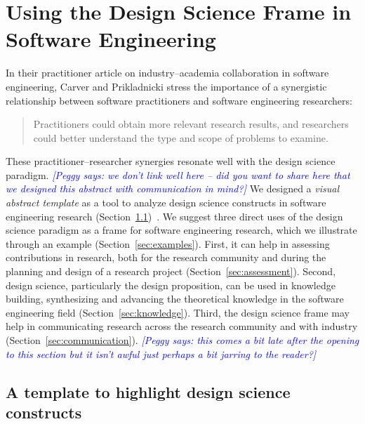 \documentclass[graybox]{svmult}
\newcommand{\peggy}[1]{\textcolor{blue}{{\it [Peggy says: #1]}}}
\newcommand{\peggy}[1]{}
\begin{document}
\section{Using the Design Science Frame in Software Engineering}
\label{sec:UsingDSinSE}

In their practitioner article on industry--academia collaboration in software engineering, Carver and Prikladnicki stress the importance of a synergistic relationship between software practitioners and software engineering researchers:
\begin{quote}Practitioners could obtain more relevant research results, and researchers could better understand the type and scope of problems to examine.~\cite{CarverIEEESW2018}
\end{quote} 

These practitioner--researcher synergies resonate well with the design science paradigm.
\peggy{we don't link well here -- did you want to share here that we designed this abstract with communication in mind?}
 We designed a \emph{visual abstract template} as a tool to analyze design science constructs in software engineering research  (Section~\ref{sec:VA_template})~\cite{StoreyESEM17}. We suggest three direct uses of the design science paradigm as a frame for software engineering research, which we illustrate through an example (Section~\ref{sec:examples}). First, it can help in assessing contributions in research, both for the research community and during the planning and design of a research project (Section~\ref{sec:assessment}). Second, design science, particularly the design proposition, can be used in knowledge building, synthesizing and advancing the theoretical knowledge in the software engineering field (Section~\ref{sec:knowledge}). Third, the design science frame may help in communicating research across the research community and with industry (Section~\ref{sec:communication}). 
 \peggy{this comes a bit late after the opening to this section but it isn't awful just perhaps a bit jarring to the reader?}


\subsection{A template to highlight design science constructs}%
\label{sec:VA_template}
\end{document}

